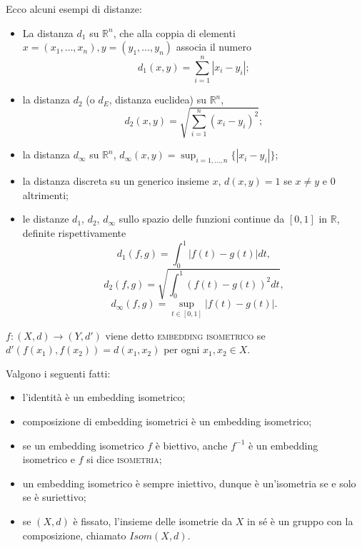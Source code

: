 \documentclass{article}
\begin{document}
\begin{ex}
Ecco alcuni esempi di distanze:
\begin{itemize}
\item La distanza $d_1$ su $\mathbb{R}^n$, che alla coppia di elementi
${x=(x_1, \dots, x_n)}, {y=(y_1, \dots, y_n)}$
 associa il numero
 $${\displaystyle d_1(x, y)=\sum_{i=1}^n |x_i-y_i|};$$
\item la distanza $d_2$ (o $d_E$, distanza
euclidea) su $\mathbb{R}^n$,
$$\displaystyle d_2(x, y)=\sqrt{\sum_{i=1}^n (x_i-y_i)^2};$$
\item la distanza $d_{\infty}$ su $\mathbb{R}^n$,
${\displaystyle d_{\infty}(x, y)=\sup_{i=1, \dots, n} \{ |x_i-y_i| \}}$;
\item
la distanza discreta su un generico insieme $x$, $d(x, y)=1$ se $x \not= y$ e
$0$ altrimenti;
\item le distanze $d_1$, $d_2$, $d_{\infty}$ sullo spazio delle funzioni
continue da $[0, 1]$ in $\mathbb{R}$, definite rispettivamente
$${\displaystyle d_1(f, g)=\int_0^1 |f(t)-g(t)| dt},$$
$${\displaystyle d_2(f, g)=\sqrt{\int_0^1 (f(t)-g(t))^2 dt}},$$
$${\displaystyle d_{\infty}(f, g)=\sup_{t \in [0, 1]} |f(t)-g(t)|}.$$
\end{itemize}
\end{ex}

\begin{defn}
	$f:(X, d) \rightarrow (Y, d')$ viene detto \textsc{embedding isometrico} se
	$d'(f(x_1), f(x_2))=d(x_1, x_2)$ per ogni $x_1, x_2 \in X$.
\end{defn}

\begin{oss}
Valgono i seguenti fatti:
\begin{itemize}
\item l'identità è un embedding isometrico;
\item composizione di embedding isometrici è un embedding isometrico;
\item se un embedding isometrico $f$ è biettivo, anche $f^{-1}$ è un embedding
isometrico e $f$ si dice \textsc{isometria};
\item un embedding isometrico è sempre iniettivo, dunque è un'isometria se e
solo se è suriettivo;
\item se $(X, d)$ è fissato, l'insieme delle isometrie da $X$ in sé è un gruppo
con la composizione, chiamato $Isom(X,d)$.
\end{itemize}
\end{oss}
\end{document}
